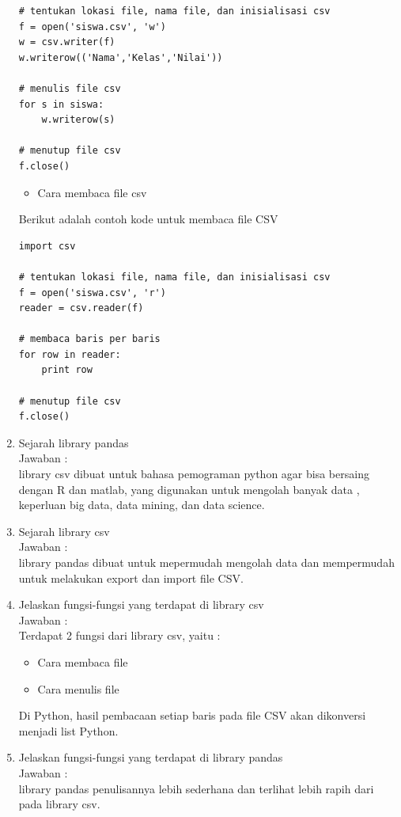 \begin{enumerate}
\begin{verbatim}
# tentukan lokasi file, nama file, dan inisialisasi csv
f = open('siswa.csv', 'w')
w = csv.writer(f)
w.writerow(('Nama','Kelas','Nilai'))

# menulis file csv
for s in siswa:
    w.writerow(s)

# menutup file csv
f.close()
\end{verbatim}

\begin{itemize}
\item Cara membaca file csv
\end{itemize}

Berikut adalah contoh kode untuk membaca file CSV 

\begin{verbatim}
import csv

# tentukan lokasi file, nama file, dan inisialisasi csv
f = open('siswa.csv', 'r')
reader = csv.reader(f)

# membaca baris per baris
for row in reader:
    print row

# menutup file csv
f.close()
\end{verbatim}

\item Sejarah library pandas\\
Jawaban :\\
library csv dibuat untuk bahasa pemograman python agar bisa bersaing dengan  R dan matlab, yang digunakan untuk mengolah banyak data , keperluan big data, data mining, dan data science.

\item Sejarah library csv\\
Jawaban :\\
library pandas dibuat untuk mepermudah mengolah data dan mempermudah untuk melakukan export dan import file CSV.

\item Jelaskan  fungsi-fungsi yang terdapat di library csv\\
Jawaban :\\
Terdapat 2 fungsi dari library csv, yaitu :

\begin{itemize}
\item Cara membaca file
\end{itemize}

\begin{itemize}
\item Cara menulis file
\end{itemize}
Di Python, hasil pembacaan setiap baris pada file CSV akan dikonversi menjadi list Python.

\item Jelaskan  fungsi-fungsi yang terdapat di library pandas\\
Jawaban :\\
library pandas penulisannya lebih sederhana dan terlihat lebih rapih dari pada library csv.

\end{enumerate}

